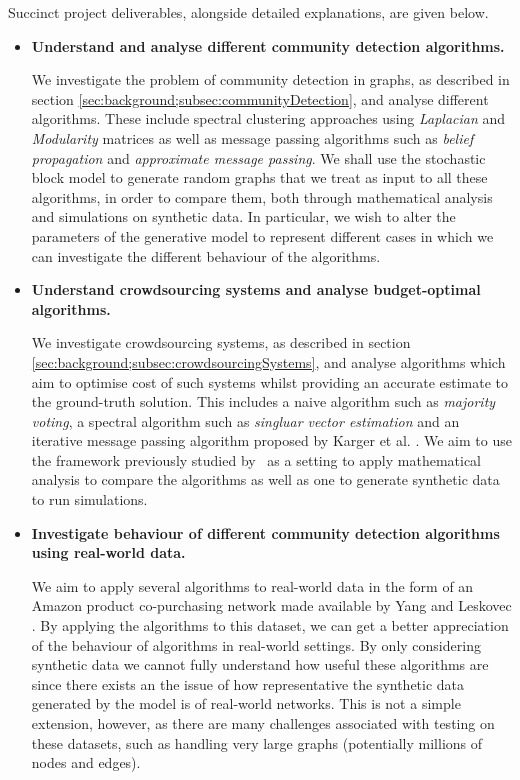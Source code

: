 \documentclass[12pt]{article}
\numberwithin{equation}{section}
\begin{document}
Succinct project deliverables, alongside detailed explanations, are given below.
\begin{itemize}
	\item \textbf{Understand and analyse different community detection algorithms.}

	We investigate the problem of community detection in graphs, as described in section \ref{sec:background;subsec:communityDetection}, and analyse different algorithms. These include spectral clustering approaches using \textit{Laplacian} and \textit{Modularity} matrices as well as message passing algorithms such as \textit{belief propagation} and \textit{approximate message passing}. We shall use the stochastic block model to generate random graphs that we treat as input to all these algorithms, in order to compare them, both through mathematical analysis and simulations on synthetic data. In particular, we wish to alter the parameters of the generative model to represent different cases in which we can investigate the different behaviour of the algorithms. 

	\item \textbf{Understand crowdsourcing systems and analyse budget-optimal algorithms.}

	We investigate crowdsourcing systems, as described in section \ref{sec:background;subsec:crowdsourcingSystems}, and analyse algorithms which aim to optimise cost of such systems whilst providing an accurate estimate to the ground-truth solution. This includes a naive algorithm such as \textit{majority voting}, a spectral algorithm such as \textit{singluar vector estimation} and an iterative message passing algorithm proposed by Karger et al. \cite{KOS13}. We aim to use the framework previously studied by~\cite{KOS13} as a setting to apply mathematical analysis to compare the algorithms as well as one to generate synthetic data to run simulations.

	\item \textbf{Investigate behaviour of different community detection algorithms using real-world data.}

	We aim to apply several algorithms to real-world data in the form of an Amazon product co-purchasing network made available by Yang and Leskovec \cite{YL12}. By applying the algorithms to this dataset, we can get a better appreciation of the behaviour of algorithms in real-world settings. By only considering synthetic data we cannot fully understand how useful these algorithms are since there exists an the issue of how representative the synthetic data generated by the model is of real-world networks. This is not a simple extension, 
however, as there are many challenges associated with testing on these datasets, such as handling very large graphs (potentially millions of nodes and edges).
\end{itemize}
\end{document}
